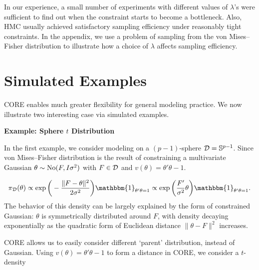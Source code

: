 \documentclass[10pt,fleqn]{article}
\DeclareMathOperator{\1}{\mathbbm{1}} \DeclareMathOperator{\bigO}{\mc O}
\begin{document}
In our experience, a small number of experiments with different values of $\lambda$'s were sufficient to find out when the constraint starts to become a bottleneck. Also, HMC usually achieved satisfactory sampling efficiency under reasonably tight constraints. In the appendix, we use a problem of sampling from the von Mises--Fisher distribution to illustrate how a choice of $\lambda$ affects sampling efficiency.

\section{Simulated Examples}

CORE enables much greater flexibility for general modeling practice. We now illustrate
two interesting case via simulated examples.

{\noindent \textbf{Example: Sphere $t$ Distribution}}

In the first example, we consider modeling on a $(p-1)$-sphere $\mathcal{D}=\mathbb S^{p-1}$. Since von
Mises--Fisher distribution \citep{khatri1977mises} is the result of
constraining a multivariate Gaussian $\theta \sim \operatorname{No}(F,I\sigma^2)$ with
$F\in \mathcal{D}$ and $v(\theta)= \theta'\theta-1$.

$$
\pi_{\mc D}(\theta) \propto
\exp\bigg(-\frac{\|F-\theta\|^2}{2\sigma^2}\bigg)
\mathbbm{1}_{\theta'\theta=1} \\
\propto
\exp\bigg(\frac{F'}{\sigma^2}\theta\bigg)
\mathbbm{1}_{\theta'\theta=1}.
$$
The behavior of this density can be largely explained by the form of constrained Gaussian: $\theta$ is symmetrically distributed around $F$, with density
decaying exponentially as the quadratic form of Euclidean distance $\|
\theta-F\|^2$ increases.

CORE allows us to easily consider different `parent' distribution, instead of Gaussian. Using
$v(\theta)=\theta'\theta-1$ to form a distance in CORE, we consider a $t$-density 
\end{document}
